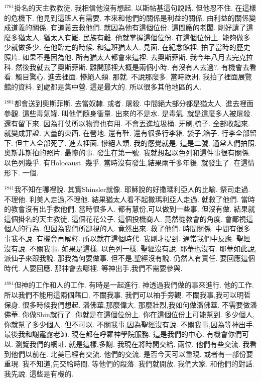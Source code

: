 \documentclass{book}
\begin{document}
$^{1761}$掛名的天主教教徒.
我相信他沒有想起.
以斯帖基這句說話.
但他忍不住.
在這樣的危機下.
他見到這班人有需要.
本來和他們的關係是利益的關係.
由利益的關係變成道義的關係.
有道義去救他們.
就因為他有這個位份.
這間廠的老闆.
剛好請了這麼多猶太人.
猶太人有難.
民族有難.
他就掌握這個位份.
在這個位份上.
能夠做多少就做多少.
在他臨走的時候.
和這班猶太人.
見面.
在紀念館裡.
拍了當時的歷史照片.
如果不是因為他.
所有猶太人都會來這裡.
去奧斯菲斯.
我今年八月去完克拉科.
然後我就去了奧斯菲斯.
離開那裡大概是兩個小時.
有沒有人去過?.
有機會去看看.
觸目驚心.
進去裡面.
慘絕人類.
那就.
不說那麼多.
當時歐洲.
我拍了裡面展覽館的資料.
到處都是集中營.
這是最大的.
所以很多其他地區的人.

$^{1801}$都會送到奧斯菲斯.
去當奴隸.
或者.
屠殺.
中間絕大部分都是猶太人.
進去裡面參觀.
這些毒氣罐.
叫他們隨身衝量.
出來的不是水.
是毒氣.
就是這麼多人被屠殺.
還有留下來.
因為打仗所以物資也有用.
不會丟進垃圾桶.
牙刷,梳子.
全部收起來.
就變成罪證.
大量的東西.
在營地.
還有鞋.
還有很多行李箱.
袋子,箱子.
行李全部留下.
但主人全部死了.
進去裡面.
慘絕人類.
我的感覺就是.
這是二號.
通常人們拍照.
奧斯菲斯拍的照片.
最慘的事.
發生在第一號.
我就想起以色列和這件事很有關係.
以色列幾乎.
有Holocaust.
幾乎.
當時沒有發生,結果兩千多年後.
就發生了.
在這情形下.
一個.

$^{1841}$我不知在哪裡說.
其實Shinsler就像.
耶穌說的好撒瑪利亞人的比喻.
祭司走過.
不理他.
利美人走過,不理他.
結果猶太人看不起撒瑪利亞人走過.
就救了他們.
當時的教會沒有出手救他們.
當時很多人.
都有慧份,可以做到一些事.
但沒有做.
結果就這個掛名的天主教徒.
這個花花公子.
這個投機商人.
竟然從教會的角度.
會鄙視這個人的行為.
但因為我們所鄙視的人.
竟然出來.
救了他們.
時間關係.
中間有很多事我不說.
有機會再解釋.
所以就在這個時代.
我剛才提到.
通常我們中反應.
聖經沒有說.
不關我事.
如果是這樣.
以色列一樣.
聖經沒有說.
耶華也沒有.
耶華如此說,派仙子來跟我說.
那我為何要做事.
但不是,聖經沒有說.
仍然人有責任.
要回應這個時代.
人要回應.
那神會去哪裡.
等神出手,我們不需要參與.

$^{1881}$但神的工作和人的工作.
有時是一起進行.
神透過我們做的事來進行.
他的工作.
所以我們不能用這兩個藉口.
不關我事.
我們可以袖手旁觀.
不關我事,我可以明哲保身.
很多時候我們想起.
潘佛華,那麼偉大.
那麼壯烈,我如何做潘佛華.
不需要做潘佛華.
你做Shin就行了.
你就是在這個位份上.
你在這個位份上可能幫到.
多少個人,你就幫了多少個人.
但不可以.
不關我事,因為聖經沒有說.
不關我事,因為等神出手.
最後我和謝霆露老師.
現在都在呼羅神學院服務.
這是我們的中心.
有機會你們可以.
瀏覽我們的網址.
就是這樣,多謝.
我現在將時間交給.
兩位.
他們有些交流.
我看到他們以前在.
北美已經有交流.
他們的交流.
是否今天可以重現.
或者有一部份要重現.
我不知道,先交給時間.
等他們的段落.
我們就開放.
我們大家.
和他們的對話.
我先說.
這些是有機的.
\end{document}
